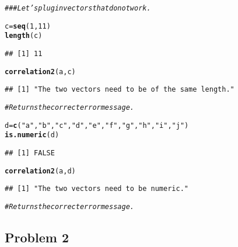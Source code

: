 \documentclass[12pt,letter]{article}\usepackage[]{graphicx}\usepackage[]{color}
\makeatletter
\newcommand{\hlnum}[1]{\textcolor[rgb]{0.686,0.059,0.569}{#1}}%
\newcommand{\hlstr}[1]{\textcolor[rgb]{0.192,0.494,0.8}{#1}}%
\newcommand{\hlcom}[1]{\textcolor[rgb]{0.678,0.584,0.686}{\textit{#1}}}%
\newcommand{\hlstd}[1]{\textcolor[rgb]{0.345,0.345,0.345}{#1}}%
\newcommand{\hlkwb}[1]{\textcolor[rgb]{0.69,0.353,0.396}{#1}}%
\newcommand{\hlkwd}[1]{\textcolor[rgb]{0.737,0.353,0.396}{\textbf{#1}}}%
\newenvironment{kframe}{%
 \def\at@end@of@kframe{}%
 \ifinner\ifhmode%
  \def\at@end@of@kframe{\end{minipage}}%
  \begin{minipage}{\columnwidth}%
 \fi\fi%
 \def\FrameCommand##1{\hskip\@totalleftmargin \hskip-\fboxsep
 \colorbox{shadecolor}{##1}\hskip-\fboxsep
     \hskip-\linewidth \hskip-\@totalleftmargin \hskip\columnwidth}%
 \MakeFramed {\advance\hsize-\width
   \@totalleftmargin\z@ \linewidth\hsize
   \@setminipage}}%
 {\par\unskip\endMakeFramed%
 \at@end@of@kframe}
\newenvironment{knitrout}{}{} %
\makeatother
\begin{document}
\begin{knitrout}
\begin{kframe}
\begin{alltt}
\hlcom{### Let's plug in vectors that do not work.}

\hlstd{c} \hlkwb{=} \hlkwd{seq}\hlstd{(}\hlnum{1}\hlstd{,} \hlnum{11}\hlstd{)}
\hlkwd{length}\hlstd{(c)}
\end{alltt}
\begin{verbatim}
## [1] 11
\end{verbatim}
\begin{alltt}
\hlkwd{correlation2}\hlstd{(a, c)}
\end{alltt}
\begin{verbatim}
## [1] "The two vectors need to be of the same length."
\end{verbatim}
\begin{alltt}
\hlcom{# Returns the correct error message.}

\hlstd{d} \hlkwb{=} \hlkwd{c}\hlstd{(}\hlstr{"a"}\hlstd{,} \hlstr{"b"}\hlstd{,} \hlstr{"c"}\hlstd{,} \hlstr{"d"}\hlstd{,} \hlstr{"e"}\hlstd{,} \hlstr{"f"}\hlstd{,} \hlstr{"g"}\hlstd{,} \hlstr{"h"}\hlstd{,} \hlstr{"i"}\hlstd{,} \hlstr{"j"}\hlstd{)}
\hlkwd{is.numeric}\hlstd{(d)}
\end{alltt}
\begin{verbatim}
## [1] FALSE
\end{verbatim}
\begin{alltt}
\hlkwd{correlation2}\hlstd{(a, d)}
\end{alltt}
\begin{verbatim}
## [1] "The two vectors need to be numeric."
\end{verbatim}
\begin{alltt}
\hlcom{# Returns the correct error message.}
\end{alltt}
\end{kframe}
\end{knitrout}



\subsection*{Problem 2}
\end{document}
